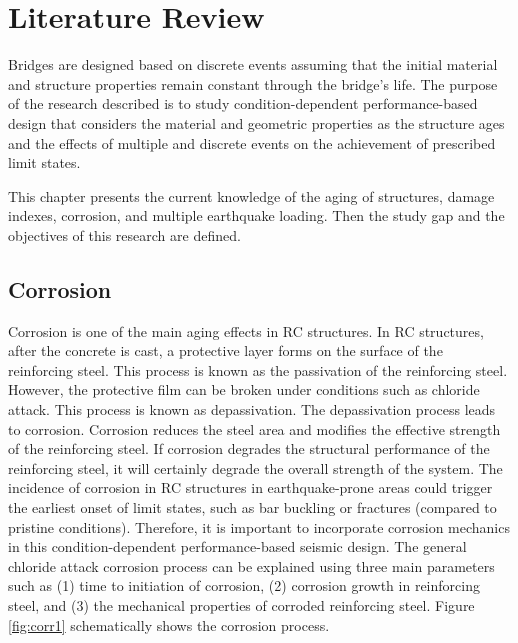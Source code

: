 \chapter{Literature Review}
\label{chap-two}

Bridges are designed based on discrete events assuming that the initial material and structure properties remain constant through the bridge's life. The purpose of the research described is to study condition-dependent performance-based design that considers the material and geometric properties as the structure ages and the effects of multiple and discrete events on the achievement of prescribed limit states.

This chapter presents the current knowledge of the aging of structures, damage indexes, corrosion, and multiple earthquake loading. Then the study gap and the objectives of this research are defined.

\section{Corrosion}

Corrosion is one of the main aging effects in RC structures. In RC structures, after the concrete is cast, a protective layer forms on the surface of the reinforcing steel. This process is known as the passivation of the reinforcing steel. However, the protective film can be broken under conditions such as chloride attack. This process is known as depassivation. The depassivation process leads to corrosion. Corrosion reduces the steel area and modifies the effective strength of the reinforcing steel. If corrosion degrades the structural performance of the reinforcing steel, it will certainly degrade the overall strength of the system. The incidence of corrosion in RC structures in earthquake-prone areas could trigger the earliest onset of limit states, such as bar buckling or fractures (compared to pristine conditions). Therefore, it is important to incorporate corrosion mechanics in this condition-dependent performance-based seismic design. The general chloride attack corrosion process can be explained using three main parameters such as (1) time to initiation of corrosion, (2) corrosion growth in reinforcing steel, and (3) the mechanical properties of corroded reinforcing steel. Figure \ref{fig:corr1} schematically shows the corrosion process.

